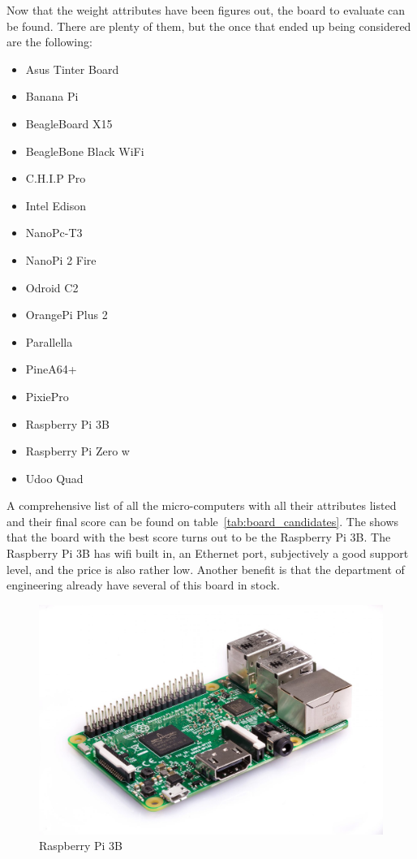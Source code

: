 Now that the weight attributes have been figures out, the board to evaluate can be found. There are plenty of them, but the once that ended up being considered are the following:
\begin{itemize}[itemsep=-1mm]
\item Asus Tinter Board \cite{asus-tinker-board}
\item Banana Pi \cite{banana-pi}
\item BeagleBoard X15 \cite{beagle-x15}
\item BeagleBone Black WiFi \cite{beagle-bone}
\item C.H.I.P Pro \cite{chip-pro}
\item Intel Edison \cite{intel-edison}
\item NanoPc-T3 \cite{nanopc}
\item NanoPi 2 Fire \cite{nanopi}
\item Odroid C2 \cite{odroid}
\item OrangePi Plus 2  \cite{orangepi}
\item Parallella \cite{parallella}
\item PineA64+ \cite{pinea64}
\item PixiePro \cite{pixiepro}
\item Raspberry Pi 3B \cite{rpi3b}
\item Raspberry Pi Zero w \cite{rpi0w}
\item Udoo Quad \cite{udoo-quad}
\end{itemize}

A comprehensive list of all the micro-computers with all their attributes listed and their final score can be found on table~\ref{tab:board_candidates}. The shows that the board with the best score turns out to be the Raspberry Pi 3B. The Raspberry Pi 3B has wifi built in, an Ethernet port, subjectively a good support level, and the price is also rather low. Another benefit is that the department of engineering already have several of this board in stock.

\begin{figure} [h]
\centering
\includegraphics[width=0.7\linewidth]{Images/Design/rpi3b}
\caption{Raspberry Pi 3B}
\label{fig:rpi3b}
\end{figure}


